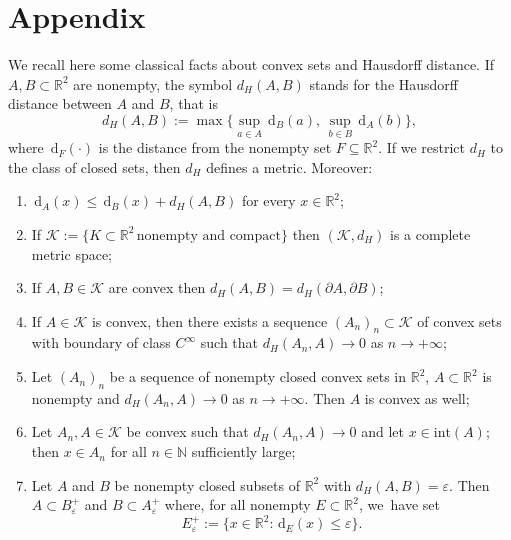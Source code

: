 \documentclass[JEP,XML,SOM,Unicode, NoFloatCountersInSection,published]{cedram}
\newcommand{\R}{\mathbb{R}}
\let\eps\varepsilon
\newcommand\compacts{\mathcal K}
\newcommand{\di}{\,\mathrm{d}}
\theoremstyle{definition}
\begin{document}
\appendix
\section*{Appendix}

We recall here some classical facts about convex sets and Hausdorff distance.
If~$A,B\subset\R^2$ are nonempty, the symbol $d_H(A,B)$
stands for the Hausdorff distance between $A$ and $B$, that is
\begin{equation*}
\textstyle
d_H(A,B):=\max\{\sup_{a\in A}
\di_B(a),\,\sup_{b\in B}\di_A(b)\},
\end{equation*}
where $\di_F(\cdot)$ is the distance from the nonempty set $F\subseteq \R^2$.
If we restrict $d_H$ to the class of closed sets,
then $d_H$ defines a metric. Moreover:
\begin{enumerate}[label=(H\arabic*),wide]
\item \label{H1}
$\di_A(x)\le \di_B(x)+d_H(A,B)$
for every $x\in\R^2$;
\item \label{H2}
If $\compacts:=\{K\subset\R^2\, \text{nonempty and compact}\}$
then $(\compacts,d_H)$
is a complete metric space;
\item \label{H3}
If $A, B \in \compacts$ are convex then $d_H(A,B)=d_H(\partial A,\partial B)$;
\item \label{H4}
If $A\in \compacts$ is convex,
then there exists a sequence $(A_n)_{n} \subset \compacts$
of convex sets with boundary of class $C^\infty$ such that
$d_H(A_n,A)\to0$ as $n\to +\infty$;
\item \label{H5} Let $(A_n)_{n}$
be a sequence of nonempty closed convex sets in $\R^2$, $A\subset\R^2$ is nonempty and $d_H(A_n,A)\to0$ as $n\to +\infty$. Then $A$ is convex as well;
\item\label{H6} Let $A_n,A\in\mathcal K$ be convex such that $d_H(A_n,A)\to0$ and let $x\in \mathrm{int}(A)$; then $x\in A_n$ for all $n\in \mathbb N$ sufficiently large;
\item \label{H7} Let $A$ and $B$ be nonempty closed subsets of $\R^2$ with $d_H(A,B)=\eps$. Then $A\subset B^+_\eps$ and $B\subset A^+_\eps$
where, for all nonempty $E\subset \R^2$, we~have set
\[
E^+_\eps:=\{x\in\R^2\colon \di_E(x)\le\eps\}.
\]
\end{enumerate}
\end{document}
